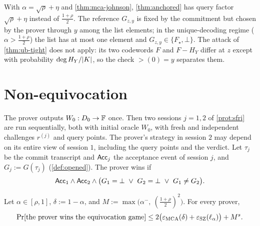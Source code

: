 \begin{remark}\label{rem:anchored-vs-unique}
With $\alpha=\sqrt\rho+\eta$ and \cref{thm:mca-johnson}, \cref{thm:anchored} has query
factor $\sqrt\rho+\eta$ instead of $\frac{1+\rho}2$. The reference $G_{z,y}$ is fixed by the
commitment but chosen by the prover through $y$ among the list elements; in the
unique-decoding regime ($\alpha>\frac{1+\rho}2$) the list has at most one element and
$G_{z,y}\in\{F_\star,\bot\}$. The attack of \cref{thm:ub-tight} does not apply: its two
codewords $F$ and $F-H_Y$ differ at $z$ except with probability $\deg H_Y/|K|$, so the check
$\gt(0)=y$ separates them.
\end{remark}

\section{Non-equivocation}

\begin{definition}\label{def:game-E}
The prover outputs $W_0:D_0\to\mathbb{F}$ once. Then two sessions $j=1,2$ of
\cref{prot:sfri} are run sequentially, both with initial oracle $W_0$, with fresh and
independent challenges $r^{(j)}$ and query points. The prover's strategy in session $2$
may depend on its entire view of session $1$, including the query points and the
verdict. Let $\tau_j$ be the commit transcript and $\mathsf{Acc}_j$ the acceptance event of
session $j$, and $G_j:=G(\tau_j)$ (\cref{def:opened}). The prover wins if
\[
\Acc_1\wedge\Acc_2\wedge\bigl(G_1=\bot\ \vee\ G_2=\bot\ \vee\ G_1\ne G_2\bigr).
\]
\end{definition}

\begin{theorem}\label{thm:equivocation}
Let $\alpha\in[\rho,1]$, $\delta:=1-\alpha$, and
$M:=\max\bigl(\alpha^-,\ (\tfrac{1+\rho}2)^2\bigr)$. For every prover,
\[
\Pr[\text{the prover wins the equivocation game}]
\le2\bigl(\varepsilon_{\mathrm{MCA}}(\delta)+\varepsilon_{\mathrm{SZ}}(\ell_\alpha)\bigr)+M^{s}.
\]
\end{theorem}


